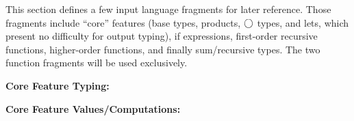\documentclass[]{article}
\newcommand {\next}{asdlfkj}
\begin{document}
\begin{abstrsyn}
This section defines a few input language fragments for later reference.
Those fragments include ``core'' features (base types, products, $\bigcirc$ types, and lets, which present no difficulty for output typing), 
if expressions, first-order recursive functions, higher-order functions, and finally sum/recursive types.
The two function fragments will be used exclusively.

\begin{framed}
\noindent\textbf{Core Feature Typing:}
\end{framed}

\begin{framed}
\noindent\textbf{Core Feature Values/Computations:}
\end{framed}


\end{abstrsyn}
\end{document}
